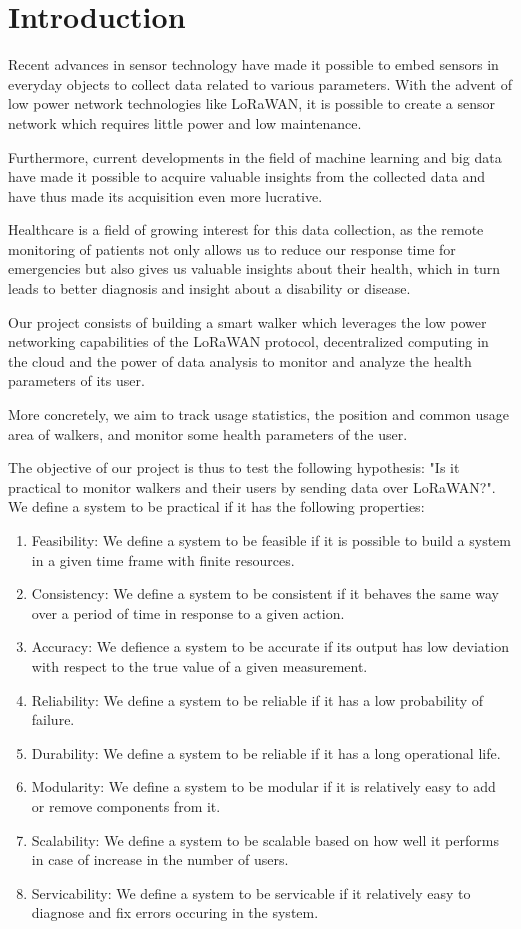 \chapter{Introduction}
\label{cha:introduction}

Recent advances in sensor technology have made it possible to embed sensors in everyday objects to collect data related to various parameters. With the advent of low power network technologies like LoRaWAN, it is possible to create a sensor network which requires little power and low maintenance.

Furthermore, current developments in the field of machine learning and big data have made it possible to acquire valuable insights from the collected data and have thus made its acquisition even more lucrative.

Healthcare is a field of growing interest for this data collection, as the remote monitoring of patients not only allows us to reduce our response time for emergencies but also gives us valuable insights about their health, which in turn leads to better diagnosis and insight about a disability or disease.

Our project consists of building a smart walker which leverages the low power networking capabilities of the LoRaWAN protocol, decentralized computing in the cloud and the power of data analysis to monitor and analyze the health parameters of its user.

More concretely, we aim to track usage statistics, the position and common usage area of walkers, and monitor some health parameters of the user.

The objective of our project is thus to test the following hypothesis:
"Is it practical to monitor walkers and their users by sending data over LoRaWAN?". We define a system to be practical if it has the following properties:

\begin{enumerate}
	\item Feasibility: We define a system to be feasible if it is possible to build a system in a given time frame with finite resources.
	\item Consistency: We define a system to be consistent if it behaves the same way over a period of time in response to a given action.
	\item Accuracy: We defience a system to be accurate if its output has low deviation with respect to the true value of a given measurement.
	\item Reliability: We define a system to be reliable if it has a low probability of failure.
	\item Durability: We define a system to be reliable if it has a long operational life.
	\item Modularity: We define a system to be modular if it is relatively easy to add or remove components from it.
	\item Scalability: We define a system to be scalable based on how well it performs in case of increase in the number of users.
	\item Servicability: We define a system to be servicable if it relatively easy to diagnose and fix errors occuring in the system.
\end{enumerate}


